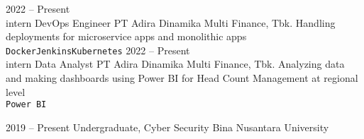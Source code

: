 \documentclass[9pt]{developercv} %
\begin{document}
\begin{center}
\end{center}



\begin{entrylist}
	\entry
		{2022 -- Present\\\footnotesize{intern}}
		{DevOps Engineer}
		{PT Adira Dinamika Multi Finance, Tbk.}
		{Handling deployments for microservice apps and monolithic apps\\ \texttt{Docker}\slashsep\texttt{Jenkins}\slashsep\texttt{Kubernetes}}
	\entry
		{2022 -- Present\\\footnotesize{intern}}
		{Data Analyst}
		{PT Adira Dinamika Multi Finance, Tbk.}
		{Analyzing data and making dashboards using Power BI for Head Count Management at regional level\\ \texttt{Power BI}}
\end{entrylist}



\begin{entrylist}
	\entry
		{2019 -- Present}
		{Undergraduate, Cyber Security}
		{Bina Nusantara University}
		{}
\end{entrylist}

\end{document}
